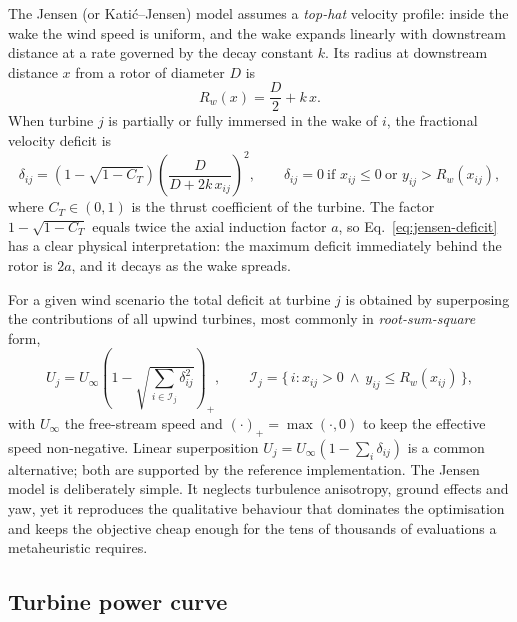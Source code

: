 \documentclass[11pt,a4paper]{article}
\begin{document}
The Jensen (or Kati\'c--Jensen) model \cite{jensen1983,katic1986} assumes a
\emph{top-hat} velocity profile: inside the wake the wind speed is uniform, and
the wake expands linearly with downstream distance at a rate governed by the
decay constant $k$. Its radius at downstream distance $x$ from a rotor of
diameter $D$ is
\begin{equation}
  R_{w}(x) = \frac{D}{2} + k\,x .
  \label{eq:jensen-radius}
\end{equation}
When turbine $j$ is partially or fully immersed in the wake of $i$, the
fractional velocity deficit is
\begin{equation}
  \delta_{ij}
  = \left( 1-\sqrt{1-C_{T}} \right)
    \left( \frac{D}{D + 2k\,x_{ij}} \right)^{2},
  \qquad
  \delta_{ij}=0 \ \text{if } x_{ij}\le 0 \ \text{or } y_{ij} > R_{w}(x_{ij}),
  \label{eq:jensen-deficit}
\end{equation}
where $C_{T}\in(0,1)$ is the thrust coefficient of the turbine. The factor
$1-\sqrt{1-C_{T}}$ equals twice the axial induction factor $a$, so
Eq.~\eqref{eq:jensen-deficit} has a clear physical interpretation: the maximum
deficit immediately behind the rotor is $2a$, and it decays as the wake spreads.

For a given wind scenario the total deficit at turbine $j$ is obtained by
superposing the contributions of all upwind turbines, most commonly in
\emph{root-sum-square} form,
\begin{equation}
  U_{j} = U_{\infty}\left( 1-\sqrt{\sum_{i \in \mathcal{I}_{j}} \delta_{ij}^{2}} \right)_{+},
  \qquad
  \mathcal{I}_{j} = \bigl\{\, i : x_{ij}>0 \ \wedge\ y_{ij} \le R_{w}(x_{ij}) \,\bigr\},
  \label{eq:effective-speed}
\end{equation}
with $U_{\infty}$ the free-stream speed and $(\cdot)_{+}=\max(\cdot,0)$ to keep
the effective speed non-negative. Linear superposition
$U_{j}=U_{\infty}(1-\sum_{i}\delta_{ij})$ is a common alternative; both are
supported by the reference implementation. The Jensen model is deliberately
simple. It neglects turbulence anisotropy, ground effects and yaw, yet it
reproduces the qualitative behaviour that dominates the optimisation and keeps
the objective cheap enough for the tens of thousands of evaluations a
metaheuristic requires.

\subsection{Turbine power curve}
\end{document}
